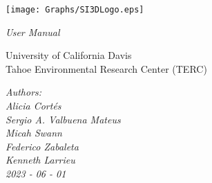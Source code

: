 \begin{titlepage}
    \begin{center}
        \centerline{
        \texttt{[image: Graphs/SI3DLogo.eps]}}

        \vspace{0.5cm}
        \huge{
        {\selectfont
        \textit{User Manual}
        }
        }
        \vspace{1cm}

        {\selectfont
        \Large{
        University of California Davis\\
        Tahoe Environmental Research Center (TERC)
        }
        }
        
        \vspace{0.5cm}
        {\selectfont
        \Large{
        \textit{Authors:}\\
        \textit{Alicia Cort\'{e}s}\\
        \textit{Sergio A. Valbuena Mateus}\\
        \textit{Micah Swann}\\
        \textit{Federico Zabaleta}\\
        \textit{Kenneth Larrieu}\\
        }
        \vspace{0.5cm}
        {\selectfont
        \textit{2023 - 06 - 01}\\
        }
        }

    \end{center}
\end{titlepage}